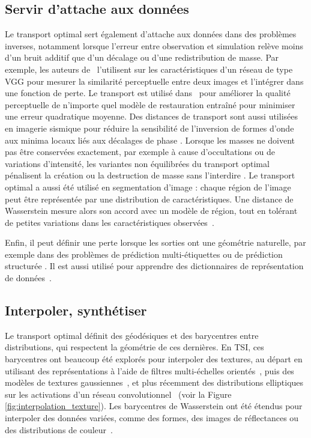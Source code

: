 \documentclass[11pt,a4paper]{article}
\begin{document}
\subsection{Servir d'attache aux données}
\label{sec:attache}
Le transport optimal sert également d'attache aux données dans des problèmes inverses, notamment lorsque l'erreur entre observation et simulation relève moins d'un bruit additif que d'un décalage ou d'une redistribution de masse. Par exemple, les auteurs de~\cite{Delbracio:2020aa} l'utilisent sur les caractéristiques d'un réseau de type VGG pour mesurer la similarité perceptuelle entre deux images et l'intégrer dans une fonction de perte. Le transport est utilisé dans~\cite{Adrai:2023aa} pour améliorer la qualité perceptuelle de n'importe quel modèle de restauration entraîné pour minimiser une erreur quadratique moyenne. Des distances de transport sont aussi utilisées en imagerie sismique pour réduire la sensibilité de l'inversion de formes d'onde aux minima locaux liés aux décalages de phase \cite{Metivier2016}. 
Lorsque les masses ne doivent pas être conservées exactement, par exemple à
cause d'occultations ou de variations d'intensité, les variantes non équilibrées
du transport optimal pénalisent la création ou la destruction de masse sans
l'interdire \cite{Chizat2018}.
Le transport optimal a aussi été utilisé en segmentation d'image : chaque région de l’image peut être représentée par une distribution de caractéristiques. Une distance de Wasserstein mesure alors son accord avec un modèle de région, tout en tolérant de petites variations dans les caractéristiques observées~\cite{peyre2012wasserstein,papadakis2017convex}.

Enfin, il peut définir une perte lorsque les sorties ont une géométrie naturelle, par
exemple dans des problèmes de prédiction multi-étiquettes \cite{Frogner2015} ou
de prédiction structurée \cite{brogat2022learning}. Il est aussi utilisé pour
apprendre des dictionnaires de représentation de
données~\cite{sandler2011nonnegative,schmitz2018wasserstein}. 



\subsection{Interpoler, synthétiser}
\label{sec:barycenters}
Le transport optimal définit des géodésiques et des barycentres entre distributions, qui respectent la géométrie de ces dernières. En TSI, ces barycentres ont beaucoup été explorés pour interpoler des textures, au départ en utilisant des représentations à l'aide de filtres multi-échelles orientés~\cite{Rabin2012}, puis des modèles de textures gaussiennes~\cite{Xia2014}, et plus récemment des distributions elliptiques sur les activations d'un réseau convolutionnel~\cite{Vacher2020} (voir la Figure \ref{fig:interpolation_texture}). Les barycentres de Wasserstein ont été étendus pour interpoler des données variées, comme des formes, des images de réflectances ou des distributions de couleur~\cite{Solomon2015}.
\end{document}
